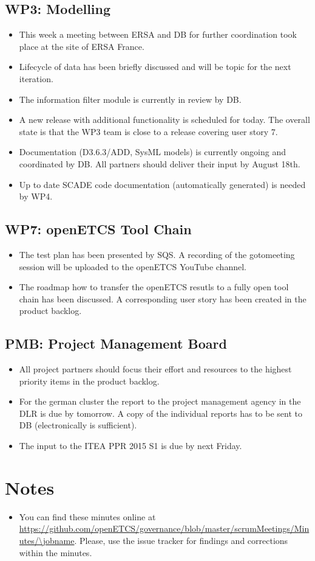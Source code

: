 \documentclass[a4paper, 11pt]{article}
\begin{document}
\subsection{WP3: Modelling}

\begin{itemize}
\item This week a meeting between ERSA and DB for further coordination took place at the site of ERSA France.
\item Lifecycle of data has been briefly discussed and will be topic for the next iteration.
\item The information filter module is currently in review by DB.
\item A new release with additional functionality is scheduled for today. The overall state is that the WP3 team is close to a release covering user story 7.
\item Documentation (D3.6.3/ADD, SysML models) is currently ongoing and coordinated by DB. All partners should deliver their input by August 18th.
\item Up to date SCADE code documentation (automatically generated) is needed by WP4.
\end{itemize}

\subsection{WP7: openETCS Tool Chain}

\begin{itemize}
\item The test plan has been presented by SQS. A recording of the gotomeeting session will be uploaded to the openETCS YouTube channel.
\item The roadmap how to transfer the openETCS resutls to a fully open tool chain has been discussed. A corresponding user story has been created in the product backlog.
\end{itemize}

\subsection{PMB: Project Management Board}

\begin{itemize}
\item All project partners should focus their effort and resources to the highest priority items in the product backlog.
\item For the german cluster the report to the project management agency in the DLR is due by tomorrow. A copy of the individual reports has to be sent to DB (electronically is sufficient).
\item The input to the ITEA PPR 2015 S1 is due by next Friday.
\end{itemize}

\section{Notes}


\begin{itemize}
\item You can find these minutes online at \url{https://github.com/openETCS/governance/blob/master/scrumMeetings/Minutes/\jobname}. Please, use the issue tracker for findings and corrections within the minutes.
\end{itemize}
\end{document}
